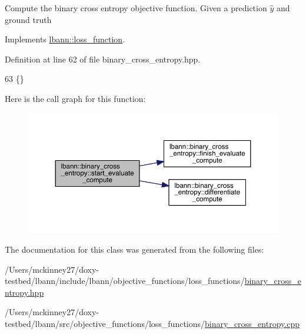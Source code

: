 Compute the binary cross entropy objective function. Given a prediction $\hat{y}$ and ground truth 

Implements \hyperlink{classlbann_1_1loss__function_a0bbe41060d788dc7a29f3737761a6f7d}{lbann\+::loss\+\_\+function}.



Definition at line 62 of file binary\+\_\+cross\+\_\+entropy.\+hpp.


\begin{DoxyCode}
63                                                                        \{\}
\end{DoxyCode}
Here is the call graph for this function\+:\nopagebreak
\begin{figure}[H]
\begin{center}
\leavevmode
\includegraphics[width=350pt]{classlbann_1_1binary__cross__entropy_a4acaf96a18b00b38adae375a69740071_cgraph}
\end{center}
\end{figure}


The documentation for this class was generated from the following files\+:\begin{DoxyCompactItemize}
\item 
/\+Users/mckinney27/doxy-\/testbed/lbann/include/lbann/objective\+\_\+functions/loss\+\_\+functions/\hyperlink{binary__cross__entropy_8hpp}{binary\+\_\+cross\+\_\+entropy.\+hpp}\item 
/\+Users/mckinney27/doxy-\/testbed/lbann/src/objective\+\_\+functions/loss\+\_\+functions/\hyperlink{binary__cross__entropy_8cpp}{binary\+\_\+cross\+\_\+entropy.\+cpp}\end{DoxyCompactItemize}
